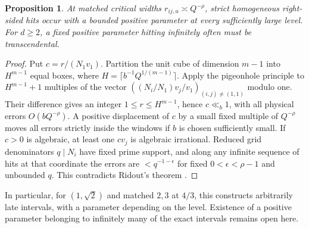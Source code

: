 \documentclass[11pt,reqno,a4paper]{amsart}
\newtheorem{proposition}[theorem]{Proposition}
\theoremstyle{remark}
\numberwithin{equation}{section}
\begin{document}
\begin{proposition}\label{prop:matched}
At matched critical widths \(r_{ij,u}\asymp Q^{-\rho}\), strict homogeneous right-sided hits occur with a bounded positive parameter at every sufficiently large level. For \(d\ge2\), a fixed positive parameter hitting infinitely often must be transcendental.
\end{proposition}
\begin{proof}
Put \(c=r/(N_1v_1)\). Partition the unit cube of dimension \(m-1\) into \(H^{m-1}\) equal boxes, where \(H=\lceil b^{-1}Q^{1/(m-1)}\rceil\). Apply the pigeonhole principle to \(H^{m-1}+1\) multiples of the vector \(((N_i/N_1)v_j/v_1)_{(i,j)\ne(1,1)}\) modulo one. Their difference gives an integer \(1\le r\le H^{m-1}\), hence \(c\ll_b1\), with all physical errors \(O(bQ^{-\rho})\). A positive displacement of \(c\) by a small fixed multiple of \(Q^{-\rho}\) moves all errors strictly inside the windows if \(b\) is chosen sufficiently small. If \(c>0\) is algebraic, at least one \(cv_j\) is algebraic irrational. Reduced grid denominators \(q\mid N_i\) have fixed prime support, and along any infinite sequence of hits at that coordinate the errors are \(<q^{-1-\epsilon}\) for fixed \(0<\epsilon<\rho-1\) and unbounded \(q\). This contradicts Ridout's theorem \cite{Ridout}.
\end{proof}

In particular, for \((1,\sqrt2)\) and matched \(2,3\) at \(4/3\), this constructs arbitrarily late intervals, with a parameter depending on the level. Existence of a positive parameter belonging to infinitely many of the exact intervals remains open here.
\end{document}
